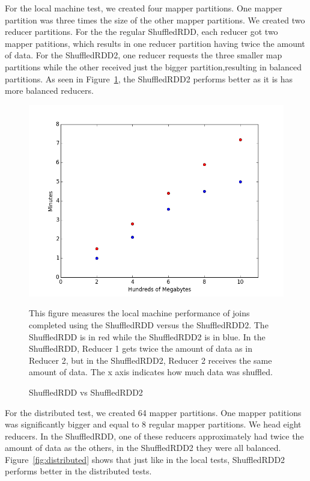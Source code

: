 For the local machine test, we created four mapper partitions. One mapper partition was three times the size of the other mapper partitions.
We created two reducer partitions. For the the regular ShuffledRDD, each reducer got two mapper patitions, which results in one reducer partition
having twice the amount of data. For the ShuffledRDD2, one reducer requests the three smaller map partitions while the other received just the bigger partition,resulting in balanced partitions. As seen in Figure~\ref{fig:local}, the ShuffledRDD2 performs better as it is  
has more balanced reducers.
\begin{figure}[h]
\begin{center}
\includegraphics[scale=0.6]{./img/localshuffle.png}
\caption{ShuffledRDD vs ShuffledRDD2}
\label{fig:local}
\end{center}
This figure measures the local machine performance of joins completed using the ShuffledRDD versus the ShuffledRDD2.
The ShuffledRDD is in red while the ShuffledRDD2 is in blue. In the ShuffledRDD, Reducer 1 gets twice the amount of
data as in Reducer 2, but in the ShuffledRDD2, Reducer 2 receives the same amount of data. The x axis indicates how much data was
shuffled.  
\end{figure}

For the distributed test, we created 64 mapper partitions. One  mapper patitions was significantly bigger and equal to 8 regular mapper partitions.
We head eight reducers. In the ShuffledRDD, one of these reducers approximately had twice the amount of data as the others, in the ShuffledRDD2 they were all
balanced. Figure~\ref{fig:distributed} shows that just like in the local tests, ShuffledRDD2 performs better in the distributed tests.

